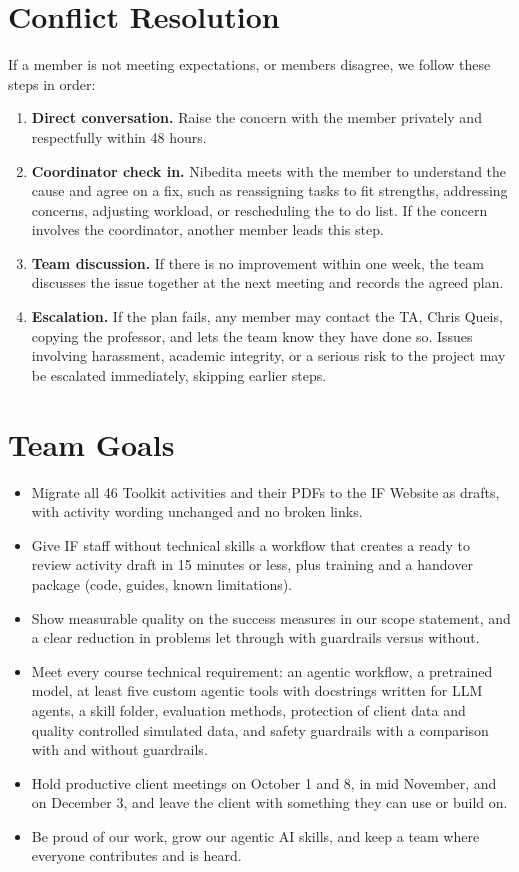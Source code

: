 \documentclass[11pt]{article}
\begin{document}
\section{Conflict Resolution}

If a member is not meeting expectations, or members disagree, we follow these steps in order:
\begin{enumerate}
  \item \textbf{Direct conversation.} Raise the concern with the member privately and respectfully within 48 hours.
  \item \textbf{Coordinator check in.} Nibedita meets with the member to understand the cause and agree on a fix, such as reassigning tasks to fit strengths, addressing concerns, adjusting workload, or rescheduling the to do list. If the concern involves the coordinator, another member leads this step.
  \item \textbf{Team discussion.} If there is no improvement within one week, the team discusses the issue together at the next meeting and records the agreed plan.
  \item \textbf{Escalation.} If the plan fails, any member may contact the TA, Chris Queis, copying the professor, and lets the team know they have done so. Issues involving harassment, academic integrity, or a serious risk to the project may be escalated immediately, skipping earlier steps.
\end{enumerate}

\section{Team Goals}

\begin{itemize}
  \item Migrate all 46 Toolkit activities and their PDFs to the IF Website as drafts, with activity wording unchanged and no broken links.
  \item Give IF staff without technical skills a workflow that creates a ready to review activity draft in 15 minutes or less, plus training and a handover package (code, guides, known limitations).
  \item Show measurable quality on the success measures in our scope statement, and a clear reduction in problems let through with guardrails versus without.
  \item Meet every course technical requirement: an agentic workflow, a pretrained model, at least five custom agentic tools with docstrings written for LLM agents, a skill folder, evaluation methods, protection of client data and quality controlled simulated data, and safety guardrails with a comparison with and without guardrails.
  \item Hold productive client meetings on October 1 and 8, in mid November, and on December 3, and leave the client with something they can use or build on.
  \item Be proud of our work, grow our agentic AI skills, and keep a team where everyone contributes and is heard.
\end{itemize}
\end{document}
